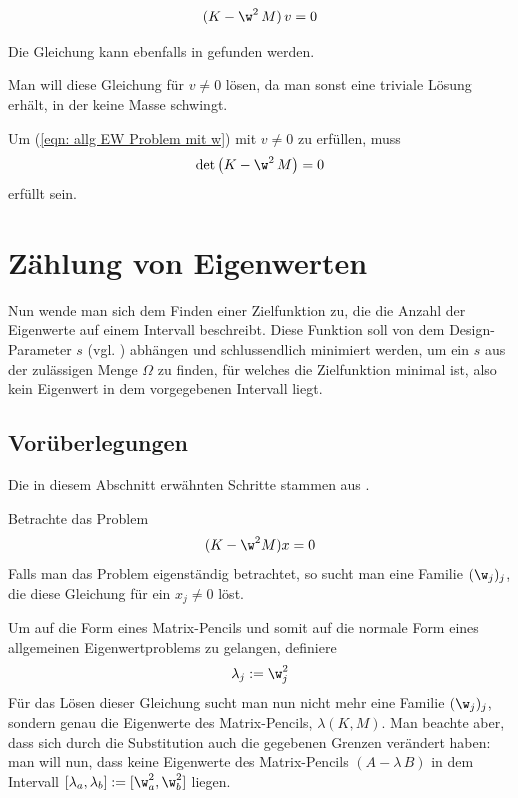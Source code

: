 \documentclass[a4paper,12pt]{report}
\newcommand{\klammer}[1]{\left(#1\right)}
\newcommand{\AlamB}{A-\lambda\,B}
\newcommand{\1}{\mathds{1}}
\theoremstyle{plain} %
\theoremstyle{definition} %
\theoremstyle{remark}
\begin{document}
            \begin{equation}
                  \label{eqn: allg EW Problem mit w}
                  (K-\w^2\,M)\,v = 0
            \end{equation}

            Die Gleichung kann ebenfalls in \cite[S. 380]{maschinendynamikDresig} gefunden werden.

            Man will diese Gleichung für $v\ne 0$ lösen, da man sonst eine triviale Lösung erhält, in der keine Masse schwingt.


            Um (\ref{eqn: allg EW Problem mit w}) mit $v\ne 0$ zu erfüllen, muss
            $$\det\klammer{K-\w^2\,M} = 0$$
            erfüllt sein.

\chapter{Zählung von Eigenwerten}
\label{sec: EW Zählung}
      Nun wende man sich dem Finden einer Zielfunktion zu, die die Anzahl der Eigenwerte auf einem Intervall beschreibt.
      Diese Funktion soll von dem Design-Parameter $s$ (vgl. \cite[S. 2]{hauptteilTkachuk}) abhängen und schlussendlich minimiert werden,
      um ein $s$ aus der zulässigen Menge $\Omega$ zu finden, für welches die Zielfunktion minimal ist, also kein Eigenwert in dem vorgegebenen Intervall liegt.
      
      \section{Vorüberlegungen}
            Die in diesem Abschnitt erwähnten Schritte stammen aus \cite[S. 2-4]{hauptteilTkachuk}.

            Betrachte das Problem
            $$(K-\w^2 M)x = 0$$
            Falls man das Problem eigenständig betrachtet, so sucht man eine Familie $(\w_j)_j$, die diese Gleichung für ein $x_j \ne 0$ löst.

            Um auf die Form eines Matrix-Pencils und somit auf die normale Form eines allgemeinen Eigenwertproblems zu gelangen, definiere
            $$\lambda_j := \w_j^2$$
            Für das Lösen dieser Gleichung sucht man nun nicht mehr eine Familie $(\w_j)_j$, sondern genau die Eigenwerte des Matrix-Pencils, $\lambda(K,M)$.
            Man beachte aber, dass sich durch die Substitution auch die gegebenen Grenzen verändert haben:
            man will nun, dass keine Eigenwerte des Matrix-Pencils $(\AlamB)$ in dem Intervall $[\lambda_a, \lambda_b]:=[\w_a^2,\w^2_b]$ liegen.
\end{document}
